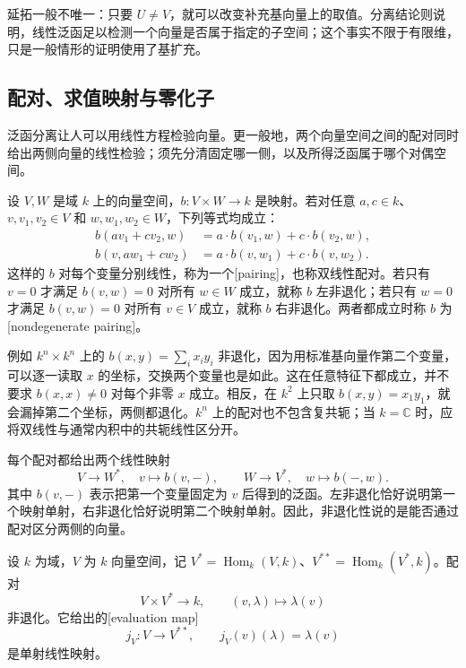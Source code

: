 延拓一般不唯一：只要 \(U\ne V\)，就可以改变补充基向量上的取值。分离结论则说明，线性泛函足以检测一个向量是否属于指定的子空间；这个事实不限于有限维，只是一般情形的证明使用了基扩充。

\subsection{配对、求值映射与零化子}
\label{b2:subsec:0102:04}

泛函分离让人可以用线性方程检验向量。更一般地，两个向量空间之间的配对同时给出两侧向量的线性检验；须先分清固定哪一侧，以及所得泛函属于哪个对偶空间。

\begin{definition}\label{b2:def:linear-pairing}
	设 \(V,W\) 是域 \(k\) 上的向量空间，\(b:V\times W\to k\) 是映射。若对任意 \(a,c\in k\)、\(v,v_1,v_2\in V\) 和 \(w,w_1,w_2\in W\)，下列等式均成立：
	\[
		\begin{aligned}
			b(av_1+cv_2,w)&=a\cdot b(v_1,w)+c\cdot b(v_2,w),\\
			b(v,aw_1+cw_2)&=a\cdot b(v,w_1)+c\cdot b(v,w_2).
		\end{aligned}
	\]
	这样的 \(b\) 对每个变量分别线性，称为一个[pairing]，也称双线性配对。若只有 \(v=0\) 才满足 \(b(v,w)=0\) 对所有 \(w\in W\) 成立，就称 \(b\) 左非退化；若只有 \(w=0\) 才满足 \(b(v,w)=0\) 对所有 \(v\in V\) 成立，就称 \(b\) 右非退化。两者都成立时称 \(b\) 为[nondegenerate pairing]。
\end{definition}

例如 \(k^n\times k^n\) 上的 \(b(x,y)=\sum_i x_iy_i\) 非退化，因为用标准基向量作第二个变量，可以逐一读取 \(x\) 的坐标，交换两个变量也是如此。这在任意特征下都成立，并不要求 \(b(x,x)\ne0\) 对每个非零 \(x\) 成立。相反，在 \(k^2\) 上只取 \(b(x,y)=x_1y_1\)，就会漏掉第二个坐标，两侧都退化。\(k^n\) 上的配对也不包含复共轭；当 \(k=\mathbb C\) 时，应将双线性与通常内积中的共轭线性区分开。

\ProseParagraphBreak
每个配对都给出两个线性映射
\[
	V\longrightarrow W^*,\quad v\longmapsto b(v,-), \qquad W\longrightarrow V^*,\quad w\longmapsto b(-,w).
\]
其中 \(b(v,-)\) 表示把第一个变量固定为 \(v\) 后得到的泛函。左非退化恰好说明第一个映射单射，右非退化恰好说明第二个映射单射。因此，非退化性说的是能否通过配对区分两侧的向量。

\begin{proposition}[求值配对]\label{b2:prop:evaluation-injective}
	设 \(k\) 为域，\(V\) 为 \(k\) 向量空间，记 \(V^*=\operatorname{Hom}_k(V,k)\)、\(V^{**}=\operatorname{Hom}_k(V^*,k)\)。配对
	\[
		V\times V^*\longrightarrow k,\qquad(v,\lambda)\longmapsto\lambda(v)
	\]
	非退化。它给出的[evaluation map]
	\[
		j_V:V\longrightarrow V^{**},\qquad j_V(v)(\lambda)=\lambda(v)
	\]
	是单射线性映射。
\end{proposition}

